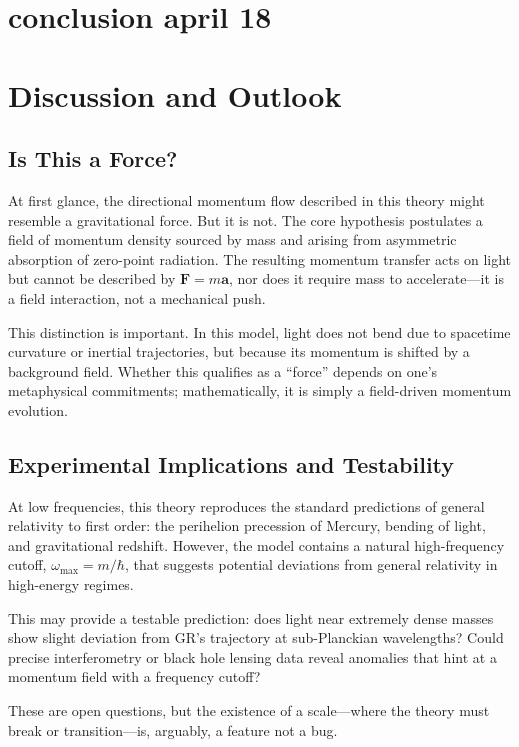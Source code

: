 \documentclass {article}
\renewcommand\vec{\mathbf}
\begin{document}
\newpage

\section {conclusion april 18}

\section{Discussion and Outlook}

\subsection{Is This a Force?}

At first glance, the directional momentum flow described in this theory might resemble a gravitational force. But it is not. The core hypothesis postulates a field of momentum density sourced by mass and arising from asymmetric absorption of zero-point radiation. The resulting momentum transfer acts on light but cannot be described by \( \vec{F} = m \vec{a} \), nor does it require mass to accelerate—it is a field interaction, not a mechanical push.

This distinction is important. In this model, light does not bend due to spacetime curvature or inertial trajectories, but because its momentum is shifted by a background field. Whether this qualifies as a “force” depends on one's metaphysical commitments; mathematically, it is simply a field-driven momentum evolution.

\subsection{Experimental Implications and Testability}

At low frequencies, this theory reproduces the standard predictions of general relativity to first order: the perihelion precession of Mercury, bending of light, and gravitational redshift. However, the model contains a natural high-frequency cutoff, \( \omega_{\text{max}} = m/\hbar \), that suggests potential deviations from general relativity in high-energy regimes. 

This may provide a testable prediction: does light near extremely dense masses show slight deviation from GR’s trajectory at sub-Planckian wavelengths? Could precise interferometry or black hole lensing data reveal anomalies that hint at a momentum field with a frequency cutoff?

These are open questions, but the existence of a scale—where the theory must break or transition—is, arguably, a feature not a bug.
\end{document}
